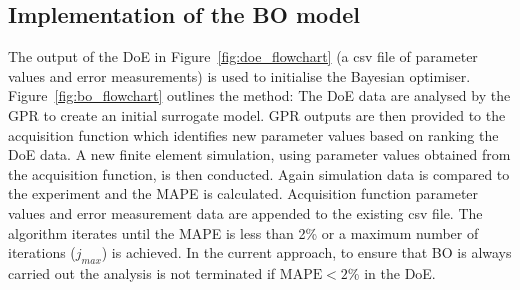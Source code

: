 \documentclass[preprint, review, 12pt]{elsarticle}
\begin{document}
	\subsection{Implementation of the BO model}
	\label{h:bayesian_opt}
	The output of the DoE in Figure~\ref{fig:doe_flowchart} (a csv file of parameter values and error measurements) is used to initialise the Bayesian optimiser.
	Figure~\ref{fig:bo_flowchart} outlines the method: The DoE data are analysed by the GPR to create an initial surrogate model.
	GPR outputs are then provided to the acquisition function which identifies new parameter values based on ranking the DoE data.
	A new finite element simulation, using parameter values obtained from the acquisition function, is then conducted.
	Again simulation data is compared to the experiment and the MAPE is calculated.
	Acquisition function parameter values and error measurement data are appended to the existing csv file.
	The algorithm iterates until the MAPE is less than 2\% or a maximum number of iterations ($j_{max}$) is achieved.
	In the current approach, to ensure that BO is always carried out the analysis is not terminated if $\text{MAPE} < 2$\% in the DoE.
\end{document}
